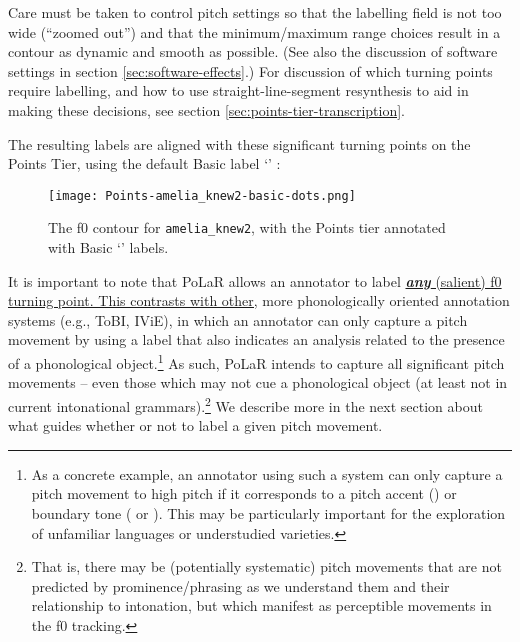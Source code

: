 \begin{infobox}[frametitle=\textbf{PRACTICAL SUGGESTIONS}]
 Care must be taken to control pitch settings so that the labelling field is not too wide (“zoomed out”) and that the minimum\slash maximum range choices result in a contour as dynamic and smooth as possible. (See also the discussion of software settings in section \ref{sec:software-effects}.) For discussion of which turning points require labelling, and how to use straight-line-segment resynthesis to aid in making these decisions, see section \ref{sec:points-tier-transcription}.
\end{infobox}

The resulting labels are aligned with these significant turning points on the Points Tier, using the default Basic label ‘’ :

\begin{figure}[H]
\centering
%
\texttt{[image: Points-amelia\_knew2-basic-dots.png]}
%
\caption{The f0 contour for \texttt{amelia\_knew2}, with the Points tier annotated with Basic ‘’ labels.%
\label{fig:amelia_knew2 f0 contour turning points 0 labels}%
%
}
\end{figure}

It is important to note that PoLaR allows an annotator to label \uline{\textit{\textbf{any}} (salient) f0 turning point. This contrasts with other,} more phonologically oriented annotation systems (e.g., ToBI, IViE), in which an annotator can only capture a pitch movement by using a label that also indicates an analysis related to the presence of a phonological object.\footnote{As a concrete example, an annotator using such a system can only capture a pitch movement to high pitch if it corresponds to a pitch accent () or boundary tone ( or ). This may be particularly important for the exploration of unfamiliar languages or understudied varieties.} As such, PoLaR intends to capture all significant pitch movements – even those which may not cue a phonological object (at least not in current intonational grammars).\footnote{That is, there may be (potentially systematic) pitch movements that are not predicted by prominence\slash phrasing as we understand them and their relationship to intonation, but which manifest as perceptible movements in the f0 tracking.} We describe more in the next section about what guides whether or not to label a given pitch movement.

